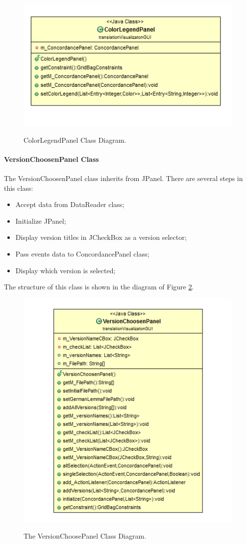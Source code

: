 	\begin{figure}[H]
	\centering    
	\includegraphics[scale=1]{Figs/Colour-Legend-Class}\\[1ex]
	\caption{ColorLegendPanel Class Diagram. }
	\label{fig:colourLegendClass}
\end{figure}


\paragraph{VersionChoosenPanel Class}
\paragraph[]{}The VersionChoosenPanel class inherits from JPanel. There are several steps in this class:
\begin{itemize}
	\item \textbf{}Accept data from DataReader class;
	\item \textbf{}Initialize JPanel;
	\item \textbf{}Display version titles in JCheckBox as a version selector;
	\item \textbf{}Pass events data to ConcordancePanel class;
	\item \textbf{}Display which version is selected;
\end{itemize}  
The structure of this class is shown in the diagram of Figure \ref{fig:versionChoosePanel}.


\begin{figure}[H]
	\centering    
	\includegraphics[scale=0.8]{Figs/VersionChoose-Class}\\[1ex]
	\caption{The VersionChoosePanel Class Diagram. }
	\label{fig:versionChoosePanel}
\end{figure}

